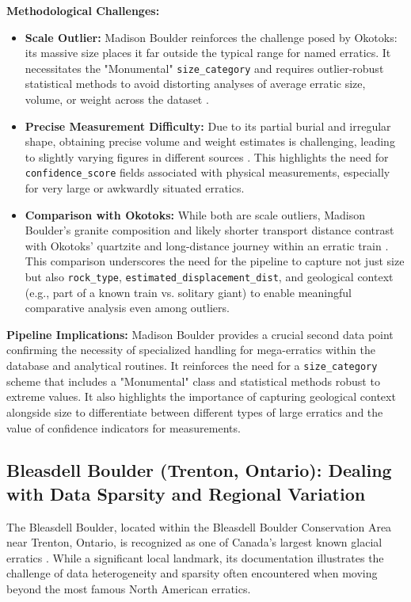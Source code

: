 \textbf{Methodological Challenges:}
\begin{itemize}
    \item \textbf{Scale Outlier:} Madison Boulder reinforces the challenge posed by Okotoks: its massive size places it far outside the typical range for named erratics. It necessitates the "Monumental" \texttt{size\_category} and requires outlier-robust statistical methods to avoid distorting analyses of average erratic size, volume, or weight across the dataset \cite{Cuffey2010}.
    \item \textbf{Precise Measurement Difficulty:} Due to its partial burial and irregular shape, obtaining precise volume and weight estimates is challenging, leading to slightly varying figures in different sources \cite{NHMadisonBoulder, NPSMadisonBoulder}. This highlights the need for \texttt{confidence\_score} fields associated with physical measurements, especially for very large or awkwardly situated erratics.
    \item \textbf{Comparison with Okotoks:} While both are scale outliers, Madison Boulder's granite composition and likely shorter transport distance contrast with Okotoks' quartzite and long-distance journey within an erratic train \cite{AlbertaOkotoks, Goldthwait1925}. This comparison underscores the need for the pipeline to capture not just size but also \texttt{rock\_type}, \texttt{estimated\_displacement\_dist}, and geological context (e.g., part of a known train vs. solitary giant) to enable meaningful comparative analysis even among outliers.
\end{itemize}

\textbf{Pipeline Implications:} Madison Boulder provides a crucial second data point confirming the necessity of specialized handling for mega-erratics within the database and analytical routines. It reinforces the need for a \texttt{size\_category} scheme that includes a "Monumental" class and statistical methods robust to extreme values. It also highlights the importance of capturing geological context alongside size to differentiate between different types of large erratics and the value of confidence indicators for measurements.

\subsection{Bleasdell Boulder (Trenton, Ontario): Dealing with Data Sparsity and Regional Variation}
\label{subsec:bleasdell}

The Bleasdell Boulder, located within the Bleasdell Boulder Conservation Area near Trenton, Ontario, is recognized as one of Canada's largest known glacial erratics \cite{LTCBleasdell, Chapman1984}. While a significant local landmark, its documentation illustrates the challenge of data heterogeneity and sparsity often encountered when moving beyond the most famous North American erratics.

